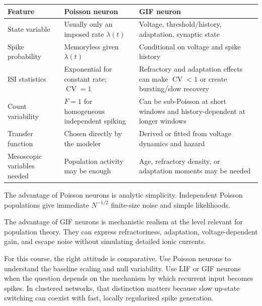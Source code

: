 \begin{center}
\renewcommand{\arraystretch}{1.45}
\begin{tabularx}{\textwidth}{@{}l X X@{}}
  \toprule
  \textbf{Feature} & \textbf{Poisson neuron} & \textbf{GIF neuron} \\
  \midrule
  State variable &
  Usually only an imposed rate $\lambda(t)$ &
  Voltage, threshold/history, adaptation, synaptic state \\
  Spike probability &
  Memoryless given $\lambda(t)$ &
  Conditional on voltage and spike history \\
  ISI statistics &
  Exponential for constant rate; $\operatorname{CV}=1$ &
  Refractory and adaptation effects can make $\operatorname{CV}<1$ or create bursting/slow recovery \\
  Count variability &
  $F=1$ for homogeneous independent spiking &
  Can be sub-Poisson at short windows and history-dependent at longer windows \\
  Transfer function &
  Chosen directly by the modeler &
  Derived or fitted from voltage dynamics and hazard \\
  Mesoscopic variables needed &
  Population activity may be enough &
  Age, refractory density, or adaptation moments may be needed \\
  \bottomrule
\end{tabularx}
\end{center}

The advantage of Poisson neurons is analytic simplicity. Independent Poisson populations give immediate $N^{-1/2}$ finite-size noise and simple likelihoods.

The advantage of GIF neurons is mechanistic realism at the level relevant for population theory. They can express refractoriness, adaptation, voltage-dependent gain, and escape noise without simulating detailed ionic currents.

For this course, the right attitude is comparative. Use Poisson neurons to understand the baseline scaling and null variability. Use LIF or GIF neurons when the question depends on the mechanism by which recurrent input becomes spikes. In clustered networks, that distinction matters because slow up-state switching can coexist with fast, locally regularized spike generation.

